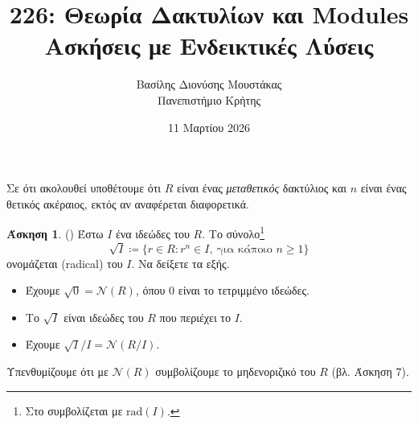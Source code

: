 \documentclass[12pt,a4paper,reqno]{amsart}
\title{226: Θεωρία Δακτυλίων και Modules \\ Ασκήσεις με Ενδεικτικές Λύσεις}
\author[Β.~Δ. Μουστακας]{Βασίλης Διονύσης Μουστάκας \\ Πανεπιστήμιο Κρήτης}
\date{11 Μαρτίου 2026}
\theoremstyle{definition}
\newtheorem{exercise}{Άσκηση}
\newcommand{\nN}{\mathcal{N}}
\newcommand{\rad}{\mathrm{rad}}
\newcommand{\defn}[1]{{\color{mylightblue}{#1}}}
\begin{document}
\begingroup
\def\uppercasenonmath#1{} %
\let\MakeUppercase\relax %
\maketitle
\endgroup

\setcounter{exercise}{10}
\setcounter{equation}{3}
\renewcommand{\thesubsection}{\thesection.\arabic{subsection}}

Σε ότι ακολουθεί υποθέτουμε ότι $R$ είναι ένας \emph{μεταθετικός} δακτύλιος και $n$ είναι ένας θετικός ακέραιος, εκτός αν αναφέρεται διαφορετικά.

\begin{exercise}{\rm(\cite[Άσκηση~7.4.30]{DF04})}
  \label{ex:DF_7.4.30}
  Έστω $I$ ένα ιδεώδες του $R$. Το σύνολο\footnote{Στο \cite{DF04} συμβολίζεται με $\rad(I)$.} 
  \[
  \sqrt{I} \coloneqq \{r \in R : r^n \in I, \ \text{για κάποιο $n \ge 1$}\}
  \]
  ονομάζεται \defn{ριζικό} (radical) του $I$. Να δείξετε τα εξής.
  \begin{itemize}
    \item[(α)] Έχουμε $\sqrt{0} = \nN(R)$, όπου $0$ είναι το τετριμμένο ιδεώδες.
    \item[(β)] Το $\sqrt{I}$ είναι ιδεώδες του $R$ που περιέχει το $I$.
    \item[(γ)] Έχουμε $\sqrt{I}/I = \nN(R/I)$.
  \end{itemize}
  Υπενθυμίζουμε ότι με $\nN(R)$ συμβολίζουμε το μηδενοριζικό του $R$ (βλ. Άσκηση 7).
\end{exercise}
\end{document}
